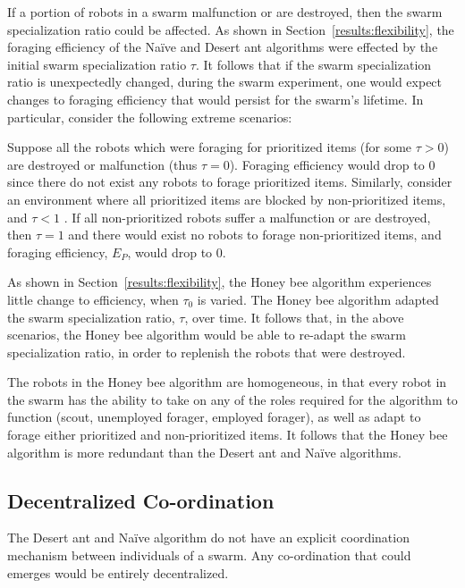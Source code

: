 If a portion of robots in a swarm malfunction or are destroyed, then the swarm specialization ratio could be affected. As shown in Section~\ref{results:flexibility}, the foraging efficiency of the Na\"ive and Desert ant algorithms were effected by the initial swarm specialization ratio $\tau$. It follows that if the swarm specialization ratio is unexpectedly changed, during the swarm experiment, one would expect changes to foraging efficiency that would persist for the swarm's lifetime. In particular, consider the following extreme scenarios: 

Suppose all the robots which were foraging for prioritized items (for some $\tau > 0$) are destroyed or malfunction (thus $\tau=0$). Foraging efficiency would drop to 0 since there do not exist any robots to forage prioritized items. Similarly, consider an environment where all prioritized items are blocked by non-prioritized items, and $\tau < 1$ . If all non-prioritized robots suffer a malfunction or are destroyed, then $\tau=1$ and there would exist no robots to forage non-prioritized items, and foraging efficiency, $E_P$, would drop to 0. 

As shown in Section~\ref{results:flexibility}, the Honey bee algorithm experiences little change to efficiency, when $\tau_0$ is varied. The Honey bee algorithm adapted the swarm specialization ratio, $\tau$, over time. It follows that, in the above scenarios, the Honey bee algorithm would be able to re-adapt the swarm specialization ratio, in order to replenish the robots that were destroyed. 

The robots in the Honey bee algorithm are homogeneous, in that every robot in the swarm has the ability to take on any of the roles required for the algorithm to function (scout, unemployed forager, employed forager), as well as adapt to forage either prioritized and non-prioritized items. It follows that the Honey bee algorithm is more redundant than the Desert ant and Na\"ive algorithms.

\subsection{Decentralized Co-ordination}
\label{results:decentralizedcoordination}


The Desert ant and Na\"ive algorithm do not have an explicit coordination mechanism between individuals of a swarm. Any co-ordination that could emerges would be entirely decentralized. 

